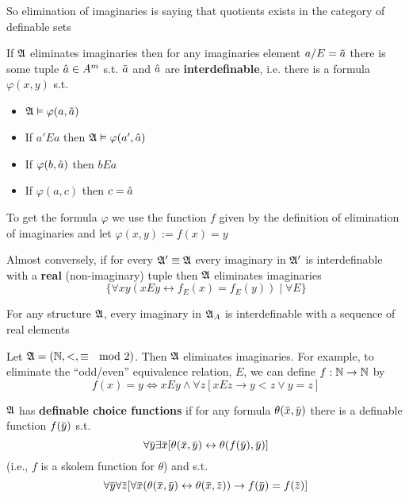 \documentclass[11pt]{article}
\begin{document}
So elimination of imaginaries is saying that quotients exists in the category of definable sets

\begin{remark}
If \(\mathfrak{A}\) eliminates imaginaries then for any imaginaries element \(a/E=\tilde{a}\) there is some
tuple \(\hat{a}\in A^m\) s.t. \(\tilde{a}\) and \(\hat{a}\) are \textbf{interdefinable}, i.e. there is a
formula \(\varphi(x,y)\) s.t.
\begin{itemize}
\item \(\mathfrak{A}\vDash\varphi(a,\tilde{a})\)
\item If \(a'Ea\) then \(\mathfrak{A}\vDash\varphi(a',\hat{a})\)
\item If \(\varphi(b,\hat{a})\) then \(bEa\)
\item If \(\varphi(a,c)\) then \(c=\hat{a}\)
\end{itemize}


To get the formula \(\varphi\) we use the function \(f\) given by the definition of elimination of
imaginaries and let \(\varphi(x,y):=f(x)=y\)
\end{remark}

Almost conversely, if for every \(\mathfrak{A}'\equiv\mathfrak{A}\) every imaginary in \(\mathfrak{A}'\) is interdefinable with a \textbf{real}
(non-imaginary) tuple then \(\mathfrak{A}\) eliminates imaginaries
\begin{equation*}
\{\forall xy(xEy\leftrightarrow f_E(x)=f_E(y))\mid \forall E\}
\end{equation*}

\begin{examplle}[]
For any structure \(\mathfrak{A}\), every imaginary in \(\mathfrak{A}_A\) is interdefinable with a sequence of real elements
\end{examplle}

\begin{examplle}[]
Let \(\mathfrak{A}=(\mathbb{N},<,\equiv\mod 2)\). Then \(\mathfrak{A}\) eliminates imaginaries. For example, to eliminate the
``odd/even'' equivalence relation, \(E\), we can define \(f:\mathbb{N}\to\mathbb{N}\) by
\begin{equation*}
f(x)=y\Leftrightarrow xEy\wedge\forall z[xEz\to y<z\vee y=z]
\end{equation*}
\end{examplle}

\begin{definition}[]
\(\mathfrak{A}\) has \textbf{definable choice functions} if for any formula \(\theta(\barx,\bary)\) there is a definable
function \(f(\bary)\) s.t.
\begin{equation*}
\forall\bary\exists\barx[\theta(\barx,\bary)\leftrightarrow\theta(f(\bary),\bary)]
\end{equation*}
(i.e., \(f\) is a skolem function for \(\theta\)) and s.t.
\begin{equation*}
\forall\bary\forall\barz[\forall\barx(\theta(\barx,\bary)\leftrightarrow\theta(\barx,\barz))\to f(\bary)=f(\barz)]
\end{equation*}
\end{definition}
\end{document}
